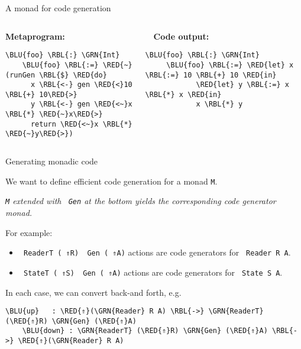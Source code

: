 \documentclass[dvipsnames,aspectratio=169]{beamer}
\theoremstyle{remark}
\newcommand{\RED}[1]{{\color{BrickRed} #1}}
\newcommand{\GRN}[1]{{\color{OliveGreen} #1}}
\newcommand{\RBL}[1]{{\color{RoyalBlue} #1}}
\newcommand{\BLU}[1]{{\color{Blue} #1}}
\begin{document}
\begin{frame}[fragile]{A monad for code generation}

\begin{columns}
\begin{column}{0.4\textwidth}
\textbf{Metaprogram:}
\begin{Verbatim}[commandchars=\\\{\}]
    \BLU{foo} \RBL{:} \GRN{Int}
    \BLU{foo} \RBL{:=} \RED{~}(runGen \RBL{$} \RED{do}
      x \RBL{<-} gen \RED{<}10 \RBL{+} 10\RED{>}
      y \RBL{<-} gen \RED{<~}x \RBL{*} \RED{~}x\RED{>}
      return \RED{<~}x \RBL{*} \RED{~}y\RED{>})
\end{Verbatim}
\end{column}

\begin{column}{0.5\textwidth}
\textbf{$\hspace{1em}$Code output:}
\begin{Verbatim}[commandchars=\\\{\}]
     \BLU{foo} \RBL{:} \GRN{Int}
     \BLU{foo} \RBL{:=} \RED{let} x \RBL{:=} 10 \RBL{+} 10 \RED{in}
            \RED{let} y \RBL{:=} x \RBL{*} x \RED{in}
            x \RBL{*} y

\end{Verbatim}
\end{column}
\end{columns}

\end{frame}

\begin{frame}[fragile]{Generating monadic code}

We want to define efficient code generation for a monad \texttt{M}.
{\center
\begin{block}{}
\center\emph{\texttt{M} extended with \texttt{\GRN{Gen}} at the bottom yields
the corresponding code generator monad.}
\end{block}}

\vspace{1em}

For example:
\begin{itemize}
\item \texttt{\GRN{ReaderT} (\RED{⇑}R) \GRN{Gen} (\RED{⇑}A)} actions
      are code generators for \texttt{\GRN{Reader} R A}.
\item \texttt{\GRN{StateT} (\RED{⇑}S) \GRN{Gen} (\RED{⇑}A)} actions
      are code generators for \texttt{\GRN{State} S A}.
\end{itemize}
\vspace{0.5em}

\pause
In each case, we can convert back-and forth, e.g.\
\vspace{0.5em}
\begin{Verbatim}[commandchars=\\\{\}]
    \BLU{up}   : \RED{⇑}(\GRN{Reader} R A) \RBL{->} \GRN{ReaderT} (\RED{⇑}R) \GRN{Gen} (\RED{⇑}A)
    \BLU{down} : \GRN{ReaderT} (\RED{⇑}R) \GRN{Gen} (\RED{⇑}A) \RBL{->} \RED{⇑}(\GRN{Reader} R A)
\end{Verbatim}

\end{frame}
\end{document}

